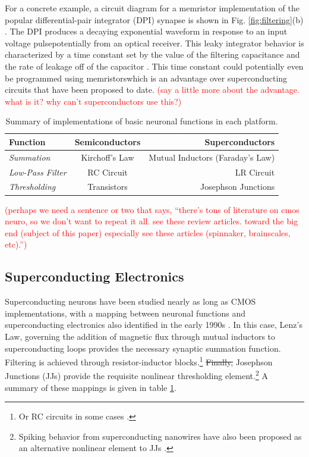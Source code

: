 \documentclass[twocolumn]{article}
\begin{document}
For a concrete example, a circuit diagram for a memristor implementation of the popular differential-pair integrator (DPI) synapse is shown in Fig. \ref{fig:filtering}(b) \cite{dalgaty2019hybrid}. The DPI produces a decaying exponential waveform in response to an input voltage pulse\textemdash potentially from an optical receiver. This leaky integrator behavior is characterized by a time constant set by the value of the filtering capacitance and the rate of leakage off of the capacitor \cite{chicca2014neuromorphic}. This time constant could potentially even be programmed using memristors\textemdash which is an advantage over superconducting circuits that have been proposed to date. \textcolor{red}{(say a little more about the advantage. what is it? why can't superconductors use this?)}

\begin{table}[h]
  \begin{center}
    \label{tab:mathtable}
    \begin{tabular}{l|c|r} %
      \textbf{Function} & \textbf{Semiconductors} & \textbf{Superconductors}\\
      \hline
      \textit{Summation} & Kirchoff's Law & Mutual Inductors (Faraday's Law)\\
      \textit{Low-Pass Filter} & RC Circuit & LR Circuit\\
      \textit{Thresholding} & Transistors & Josephson Junctions\\
    \end{tabular}
    \caption{Summary of implementations of basic neuronal functions in each platform.}
  \end{center}
\end{table}

\textcolor{red}{(perhaps we need a sentence or two that says, ``there's tons of literature on cmos neuro, so we don't want to repeat it all. see these review articles. toward the big end (subject of this paper) especially see these articles (spinnaker, brainscales, etc).'')}

\subsection{Superconducting Electronics}
Superconducting neurons have been studied nearly as long as CMOS implementations, with a mapping between neuronal functions and superconducting electronics also identified in the early 1990s \cite{hago1991, hiak1991}. In this case, Lenz's Law, governing the addition of magnetic flux through mutual inductors to superconducting loops provides the necessary synaptic summation function. Filtering is achieved through resistor-inductor blocks.\footnote{Or RC circuits in some cases \cite{crotty2010josephson}.} \sout{Finally,} Josephson Junctions (JJs) provide the requisite nonlinear thresholding element.\footnote{Spiking behavior from superconducting nanowires have also been proposed as an alternative nonlinear element to JJs \cite{toomey2019design}.} A summary of these mappings is given in table \ref{tab:mathtable}. 
\end{document}

